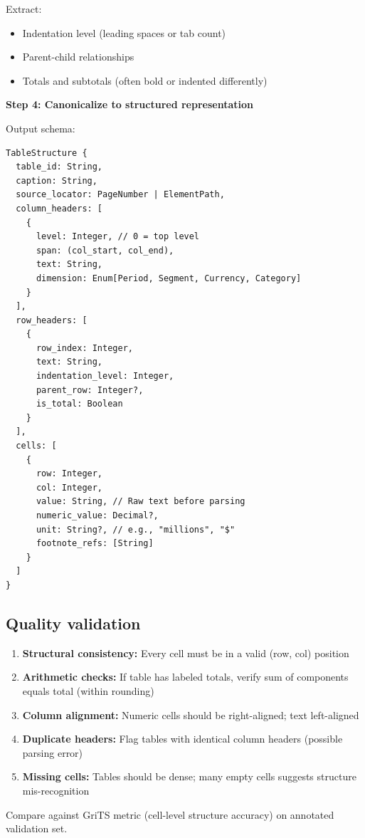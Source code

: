 Extract:
\begin{itemize}
\item Indentation level (leading spaces or tab count)
\item Parent-child relationships
\item Totals and subtotals (often bold or indented differently)
\end{itemize}

\textbf{Step 4: Canonicalize to structured representation}

Output schema:

\begin{lstlisting}
TableStructure {
  table_id: String,
  caption: String,
  source_locator: PageNumber | ElementPath,
  column_headers: [
    {
      level: Integer, // 0 = top level
      span: (col_start, col_end),
      text: String,
      dimension: Enum[Period, Segment, Currency, Category]
    }
  ],
  row_headers: [
    {
      row_index: Integer,
      text: String,
      indentation_level: Integer,
      parent_row: Integer?,
      is_total: Boolean
    }
  ],
  cells: [
    {
      row: Integer,
      col: Integer,
      value: String, // Raw text before parsing
      numeric_value: Decimal?,
      unit: String?, // e.g., "millions", "$"
      footnote_refs: [String]
    }
  ]
}
\end{lstlisting}

\subsection{Quality validation}

\begin{enumerate}
\item \textbf{Structural consistency:} Every cell must be in a valid (row, col) position
\item \textbf{Arithmetic checks:} If table has labeled totals, verify sum of components
  equals total (within rounding)
\item \textbf{Column alignment:} Numeric cells should be right-aligned; text left-aligned
\item \textbf{Duplicate headers:} Flag tables with identical column headers (possible parsing error)
\item \textbf{Missing cells:} Tables should be dense; many empty cells suggests
  structure mis-recognition
\end{enumerate}

Compare against GriTS metric (cell-level structure accuracy) on annotated validation set.

